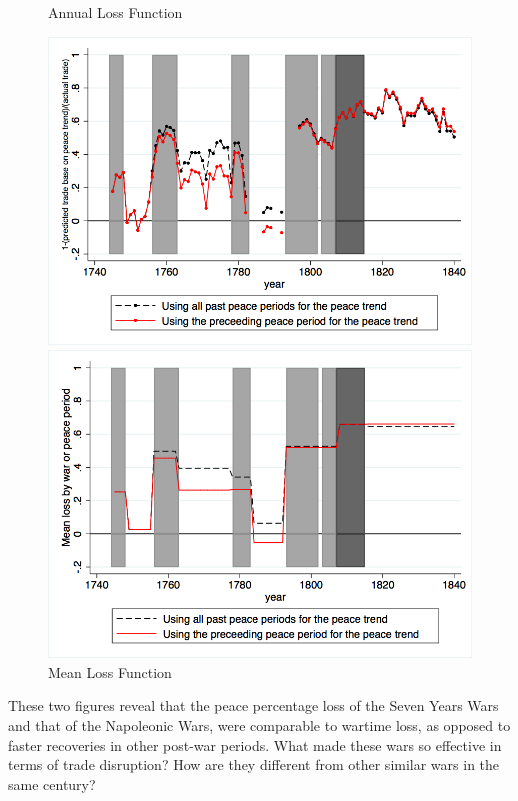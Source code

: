\documentclass[12pt,a4paper,notitlepage]{article}
\begin{document}
\begin{center}
\begin{figure}[H]
\caption{Annual Loss Function}
\label{annual_loss_function}
\centering
\includegraphics[scale=.3]{Annual_loss_function.png}
\caption{Mean Loss Function}
\label{mean_loss_function}
\includegraphics[scale=.3]{Mean_loss_function.png}
\end{figure}
\end{center}
These two figures reveal that the peace percentage loss of the Seven Years Wars and that of the Napoleonic Wars, were comparable to wartime loss, as opposed to faster recoveries in other post-war periods.
What made these wars so effective in terms of trade disruption?
How are they different from other similar wars in the same century? \\
\end{document}
